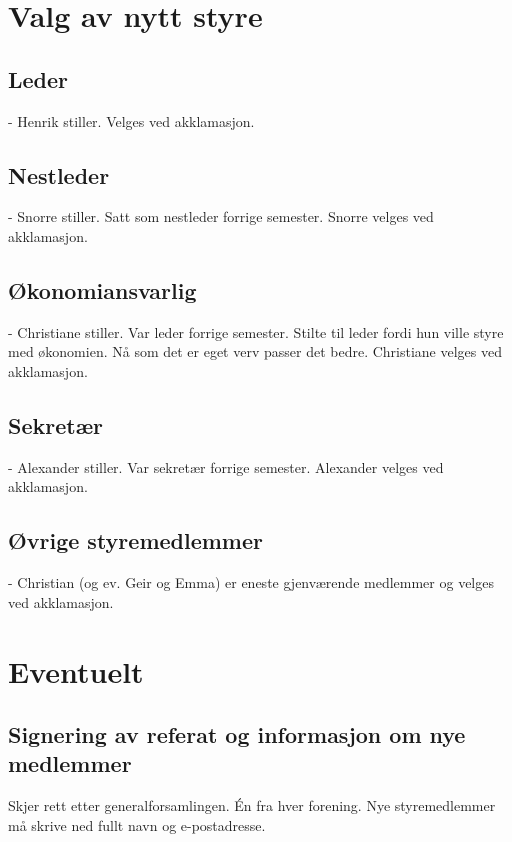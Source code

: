\documentclass{article}[12pt]
\begin{document}
\section{Valg av nytt styre}
   \subsection{Leder}
   - Henrik stiller. Velges ved akklamasjon.
   \subsection{Nestleder}
   - Snorre stiller. Satt som nestleder forrige semester. Snorre velges ved akklamasjon.
   \subsection{Økonomiansvarlig}
   - Christiane stiller. Var leder forrige semester. Stilte til leder fordi hun
   ville styre med økonomien. Nå som det er eget verv passer det bedre. Christiane velges ved akklamasjon.
   \subsection{Sekretær}
   - Alexander stiller. Var sekretær forrige semester. Alexander velges ved akklamasjon.
   \subsection{Øvrige styremedlemmer}
   - Christian (og ev. Geir og Emma) 
   er eneste gjenværende medlemmer og velges ved akklamasjon.
   
\section{Eventuelt}
\subsection{Signering av referat og informasjon om nye medlemmer}
Skjer rett etter generalforsamlingen. Én fra hver forening. 
Nye styremedlemmer må skrive ned fullt navn og e-postadresse. 
\end{document}
